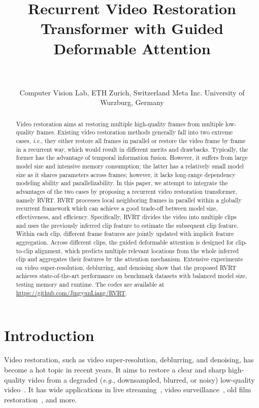 \documentclass{article}
\title{Recurrent Video Restoration Transformer with Guided Deformable Attention}
\author{
  \makecell{Jingyun Liang, \hspace{3pt}
  Yuchen Fan, \hspace{3pt}
  Xiaoyu Xiang, \hspace{3pt}
  Rakesh Ranjan, \hspace{3pt}
  Eddy Ilg \\
  Simon Green, \hspace{3pt}
  Jiezhang Cao, \hspace{3pt}
  Kai Zhang\thanks{Corresponding Author}, \hspace{3pt}
  Radu Timofte, \hspace{3pt}
  Luc Van Gool \hspace{3pt}}\\
  \\
  \hspace{-0.4cm}Computer Vision Lab, ETH Zurich, Switzerland \hspace{0pt}
  Meta Inc. \hspace{0pt}
  University of Wurzburg, Germany\\
}
\newcommand{\ie}{\textit{i}.\textit{e}.}
\newcommand{\eg}{\textit{e}.\textit{g}.}
\newlength \g
\begin{document}
\maketitle

\begin{abstract}
Video restoration aims at restoring multiple high-quality frames from multiple low-quality frames. Existing video restoration methods generally fall into two extreme cases, \ie, they either restore all frames in parallel or restore the video frame by frame in a recurrent way, which would result in different merits and drawbacks. Typically, the former has the advantage of temporal information fusion. However, it suffers from large model size and intensive memory consumption; the latter has a relatively small model size as it shares parameters across frames; however, it lacks long-range dependency modeling ability and parallelizability. In this paper, we attempt to integrate the advantages of the two cases by proposing a recurrent video restoration transformer, namely RVRT. RVRT processes local neighboring frames in parallel within a globally recurrent framework which can achieve a good trade-off between model size, effectiveness, and efficiency. Specifically, RVRT divides the video into multiple clips and uses the previously inferred clip feature to estimate the subsequent clip feature. Within each clip, different frame features are jointly updated with implicit feature aggregation. Across different clips, the guided deformable attention is designed for clip-to-clip alignment, which predicts multiple relevant locations from the whole inferred clip and aggregates their features by the attention mechanism. Extensive experiments on video super-resolution, deblurring, and denoising show that the proposed RVRT achieves state-of-the-art performance on benchmark datasets with balanced model size, testing memory and runtime. The codes are available at \url{https://github.com/JingyunLiang/RVRT}.
\end{abstract}




\section{Introduction}
Video restoration, such as video super-resolution, deblurring, and denoising, has become a hot topic in recent years. It aims to restore a clear and sharp high-quality video from a degraded (\eg, downsampled, blurred, or noisy) low-quality video~\cite{wang2019edvr, chan2021basicvsr++, cao2021videosr, liang2022vrt}. It has wide applications in live streaming~\cite{zhang2020improving}, video surveillance~\cite{liu2022video}, old film restoration~\cite{wan2022bringing}, and more.
\end{document}
